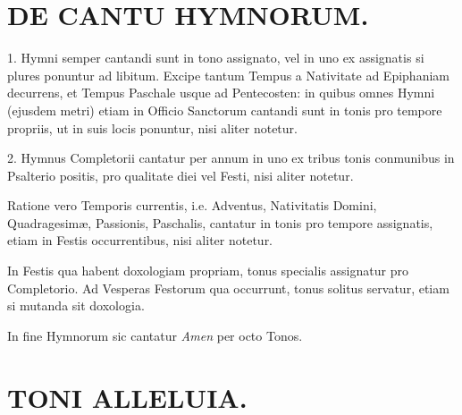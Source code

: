 \documentclass[vesperale_romanum.tex]{subfiles}
\begin{document}
\section[De Cantu Hymnorum.]{DE CANTU HYMNORUM.}

1. Hymni semper cantandi sunt in tono assignato, vel in uno ex assignatis si plures ponuntur ad libitum. Excipe tantum Tempus a Nativitate ad Epiphaniam decurrens, et Tempus Paschale usque ad Pentecosten: in quibus omnes Hymni (ejusdem metri) etiam in Officio Sanctorum cantandi sunt in tonis pro tempore propriis, ut in suis locis ponuntur, nisi aliter notetur.

2. Hymnus Completorii cantatur per annum in uno ex tribus tonis conmunibus in Psalterio positis, pro qualitate diei vel Festi, nisi aliter notetur.

Ratione vero Temporis currentis, i.e. Adventus, Nativitatis Domini, Quadragesimæ, Passionis, Paschalis, cantatur in tonis pro tempore assignatis, etiam in Festis occurrentibus, nisi aliter notetur.

In Festis qua habent doxologiam propriam, tonus specialis assignatur pro Completorio. Ad Vesperas Festorum qua occurrunt, tonus solitus servatur, etiam si mutanda sit doxologia.


In fine Hymnorum sic cantatur \textit{Amen} per octo Tonos.

\altnormal


\section[Toni « Allelúia ».]{TONI ALLELUIA.}




\altitshape
\end{document}
